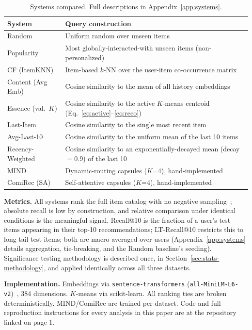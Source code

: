 \documentclass{article}
\begin{document}
\begin{table}[t]
\centering
\caption{Systems compared. Full descriptions in Appendix~\ref{app:systems}.}
\label{tab:systems}
\small
\begin{tabular}{ll}
\toprule
\textbf{System} & \textbf{Query construction} \\
\midrule
Random & Uniform random over unseen items \\
Popularity & Most globally-interacted-with unseen items (non-personalized) \\
CF (ItemKNN) & Item-based $k$-NN over the user-item co-occurrence matrix \\
Content (Avg Emb) & Cosine similarity to the mean of all history embeddings \\
Essence (val.\ $K$) & Cosine similarity to the active $K$-means centroid (Eq.~\ref{eq:active}--\ref{eq:reco}) \\
Last-Item & Cosine similarity to the single most recent item \\
Avg-Last-10 & Cosine similarity to the uniform mean of the last 10 items \\
Recency-Weighted & Cosine similarity to an exponentially-decayed mean (decay $=0.9$) of the last 10 \\
MIND & Dynamic-routing capsules ($K$=4), hand-implemented~\cite{li2019} \\
ComiRec (SA) & Self-attentive capsules ($K$=4), hand-implemented~\cite{cen2020} \\
\bottomrule
\end{tabular}
\end{table}

\textbf{Metrics.} All systems rank the full item catalog with no negative sampling~\cite{krichene2020,rendle2019}; absolute recall is low by construction, and relative comparison under identical conditions is the meaningful signal. Recall@10 is the fraction of a user's test items appearing in their top-10 recommendations; LT-Recall@10 restricts this to long-tail test items; both are macro-averaged over users (Appendix~\ref{app:systems} details aggregation, tie-breaking, and the Random baseline's seeding). Significance testing methodology is described once, in Section~\ref{sec:stats-methodology}, and applied identically across all three datasets.

\textbf{Implementation.} Embeddings via \texttt{sentence-transformers} (\texttt{all-MiniLM-L6-v2})~\cite{reimers2019,wang2020}, 384 dimensions. $K$-means via scikit-learn. All ranking ties are broken deterministically. MIND/ComiRec are trained per dataset. Code and full reproduction instructions for every analysis in this paper are at the repository linked on page 1.
\end{document}

